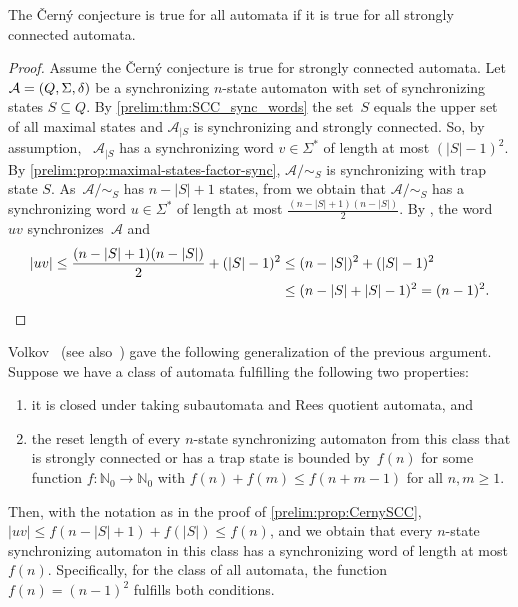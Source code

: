 \begin{proposition} \label{prelim:prop:CernySCC}
	The \v{C}ern\'y conjecture is true for all automata if  it is true for all strongly connected automata.
\end{proposition}
\begin{proof}
	Assume the \v{C}ern\'y conjecture is true for strongly connected automata.
	Let $\mathcal A = (Q, \Sigma, \delta)$ be a synchronizing $n$-state automaton
	with set of synchronizing states $S \subseteq Q$.
	By \cref{prelim:thm:SCC_sync_words} the set~$S$ equals the upper set of all maximal states
	and $\mathcal A_{|S}$ is synchronizing and strongly connected.
	So, by assumption,~
	$\mathcal A_{|S}$ has a synchronizing word $v \in \Sigma^*$ of length at most $(|S| - 1)^2$.
	By \cref{prelim:prop:maximal-states-factor-sync}, $\mathcal A / {\sim_S}$ is synchronizing with trap state $S$.
	As~$\mathcal A / {\sim_S}$ has $n - |S| + 1$ states,
	from 
    we obtain that $\mathcal A / {\sim_S}$ 
	has a synchronizing word $u \in \Sigma^*$ of length at most $\frac{( n - |S| + 1 )(n - |S|)}{2}$.	
	By , the word~$uv$
	synchronizes~$\mathcal A$ and
	\begin{align*}
		|uv| \le \frac{( n - |S| + 1 )(n - |S|)}{2} + (|S| - 1)^2
		 & \le (n - |S|)^2 + (|S|-1)^2 \\
		 & \le (n - |S| + |S| - 1)^2 = (n - 1)^2. \qedhere
	\end{align*}
\end{proof}

Volkov~\cite[Prop.~2.1]{DBLP:journals/tcs/Volkov09} (see also~\cite[Prop.~1]{AnaVolGus2013})
gave the following generalization
of the previous argument. Suppose we have a class of automata
fulfilling the following two properties:
\begin{enumerate} 
	\item it is closed under taking
	subautomata and Rees quotient automata, and
	\item the reset length of every  $n$-state synchronizing automaton from this class that is strongly connected
	or has a trap state is bounded by~$f(n)$ for some function $f \colon \mathbb N_0 \to \mathbb N_0$
	with $f(n) + f(m) \le f(n + m - 1)$ for all $n,m \ge 1$.
	
\end{enumerate} 
Then, with the notation as in the proof of \cref{prelim:prop:CernySCC},
$|uv| \le f(n - |S| + 1) + f(|S|) \le f(n)$, and we obtain that
every $n$-state synchronizing automaton in this class
has a synchronizing word of length at most $f(n)$.
Specifically, for the class of all automata, the function $f(n) = (n-1)^2$ fulfills both conditions.